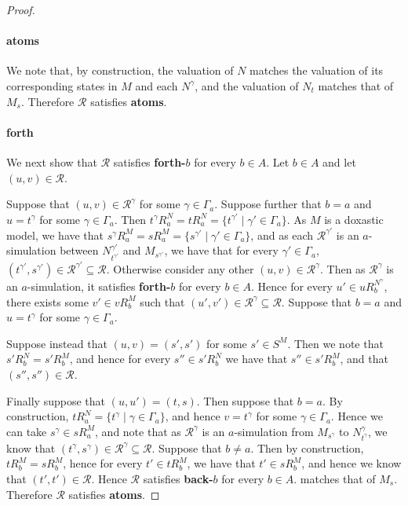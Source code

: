 \begin{proof}
\paragraph{atoms} We note that, by construction, the valuation of $N$ matches
the valuation of its corresponding states in $M$ and each $N^\gamma$, and the
valuation of $N_t$ matches that of $M_s$. Therefore $\mathcal{R}$ satisfies {\bf
atoms}.

\paragraph{forth} We next show that $\mathcal{R}$ satisfies {\bf forth-$b$} for
every $b \in A$.  Let $b \in A$ and let $(u, v) \in \mathcal{R}$.

Suppose that $(u, v) \in \mathcal{R}^\gamma$ for some $\gamma \in \Gamma_a$.
Suppose further that $b = a$ and $u = t^\gamma$ for some $\gamma \in \Gamma_a$.
Then $t^\gamma R^N_a = tR^N_a = \{t^{\gamma'} \mid \gamma' \in \Gamma_a\}$.  As
$M$ is a doxastic model, we have that $s^\gamma R^M_a = sR^M_a = \{s^{\gamma'}
\mid \gamma' \in \Gamma_a\}$, and as each $\mathcal{R}^{\gamma'}$ is an
$a$-simulation between $N^{\gamma'}_{t^{\gamma'}}$ and $M_{s^{\gamma'}}$, we
have that for every $\gamma' \in \Gamma_a$, $(t^{\gamma'}, s^{\gamma'}) \in
\mathcal{R}^{\gamma'} \subseteq \mathcal{R}$. Otherwise consider any other $(u,
v) \in \mathcal{R}^\gamma$.  Then as $\mathcal{R}^\gamma$ is an $a$-simulation,
it satisfies {\bf forth-$b$} for every $b \in A$. Hence for every $u' \in
uR^{N^\gamma}_b$, there exists some $v' \in vR^M_b$ such that $(u', v') \in
\mathcal{R}^\gamma \subseteq \mathcal{R}$. Suppose that $b = a$ and $u =
t^\gamma$ for some $\gamma \in \Gamma_a$.  

Suppose instead that $(u, v) = (s', s')$ for some $s' \in S^M$.  Then we note
that $s'R^N_b = s'R^M_b$, and hence for every $s'' \in s'R^N_b$ we have that
$s'' \in s'R^M_b$, and that $(s'', s'') \in \mathcal{R}$. 

Finally suppose that $(u, u') = (t, s)$. Then suppose that $b = a$. By
construction, $tR^N_a = \{t^\gamma \mid \gamma \in \Gamma_a\}$, and hence $v =
t^\gamma$ for some $\gamma \in \Gamma_a$. Hence we can take $s^\gamma \in
sR^M_a$, and note that as $\mathcal{R}^\gamma$ is an $a$-simulation from
$M_{s^\gamma}$ to $N^\gamma_{t^\gamma}$, we know that $(t^\gamma, s^\gamma) \in
\mathcal{R}^\gamma \subseteq \mathcal{R}$. Suppose that $b \neq a$. Then by
construction, $tR^M_b = sR^M_b$, hence for every $t' \in tR^M_b$, we have that
$t' \in sR^M_b$, and hence we know that $(t', t') \in \mathcal{R}$. Hence
$\mathcal{R}$ satisfies {\bf back-$b$} for every $b \in A$.  matches that of
$M_s$. Therefore $\mathcal{R}$ satisfies {\bf atoms}.


\end{proof}
